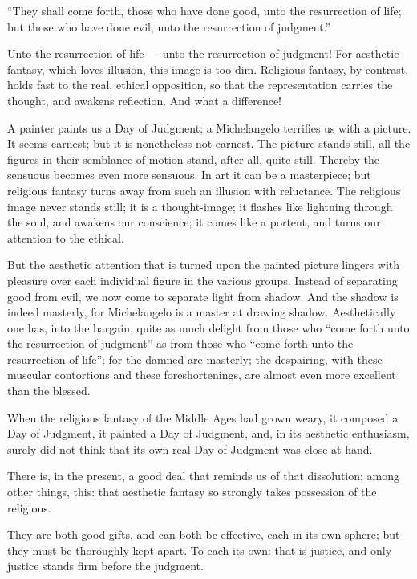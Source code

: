 \documentclass[12pt,a4paper]{book}
\begin{document}
``They shall come forth, those who have done good, unto the resurrection of life; but those who have done evil, unto the resurrection of judgment.''

Unto the resurrection of life --- unto the resurrection of judgment! For aesthetic fantasy, which loves illusion, this image is too dim. Religious fantasy, by contrast, holds fast to the real, ethical opposition, so that the representation carries the thought, and awakens reflection. And what a difference!

A painter paints us a Day of Judgment; a Michelangelo terrifies us with a picture. It seems earnest; but it is nonetheless not earnest. The picture stands still, all the figures in their semblance of motion stand, after all, quite still. Thereby the sensuous becomes even more sensuous. In art it can be a masterpiece; but religious fantasy turns away from such an illusion with reluctance. The religious image never stands still; it is a thought-image; it flashes like lightning through
the soul, and awakens our conscience; it comes like a portent, and turns our attention to the ethical.

But the aesthetic attention that is turned upon the painted picture lingers with pleasure over each individual figure in the various groups. Instead of separating good from evil, we now come to separate light from shadow. And the shadow is indeed masterly, for Michelangelo is a master at drawing shadow. Aesthetically one has, into the bargain, quite as much delight from those who ``come forth unto the resurrection of judgment'' as from those who ``come forth unto the resurrection of life''; for the damned are masterly; the despairing, with these muscular contortions and these foreshortenings, are almost even more excellent than the blessed.

When the religious fantasy of the Middle Ages had grown weary, it composed a Day of Judgment, it painted a Day of Judgment, and, in its aesthetic enthusiasm, surely did not think that its own real Day of Judgment was close at hand.

There is, in the present, a good deal that reminds us of that dissolution; among other things, this: that aesthetic fantasy so strongly takes possession of the religious.

They are both good gifts, and can both be effective, each in its own sphere; but they must be thoroughly kept apart. To each its own: that is justice, and only justice stands firm before the judgment.
\end{document}
